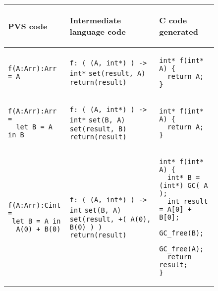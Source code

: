 \documentclass[12pt,a4paper]{article}
\newcommand{\cl}[1]{\texttt{#1}}
\begin{document}
\begin{figure}[!ht]
\begin{tabular}{|p{5.2cm}|p{5.8cm}|p{6cm}|}
\hline
\begin{center}
PVS code
\end{center} &
\begin{center}
Intermediate language code
\end{center} &
\begin{center}
C code generated
\end{center} \\ \hline

\begin{lstlisting}
f(A:Arr):Arr = A
\end{lstlisting} &
\cl{f: ( (A, int*) ) -> int*} \newline
\cl{set(result, A)} \newline
\cl{return(result)} &
\begin{lstlisting}
int* f(int* A) {
  return A;
}
\end{lstlisting} \\ \hline

\begin{lstlisting}
f(A:Arr):Arr =
  let B = A in B
\end{lstlisting} &
\cl{f: ( (A, int*) ) -> int*} \newline
\cl{set(B, A)} \newline
\cl{set(result, B)} \newline
\cl{return(result)} &
\begin{lstlisting}
int* f(int* A) {
  return A;
}
\end{lstlisting} \\ \hline

\begin{lstlisting}
f(A:Arr):Cint =
 let B = A in
  A(0) + B(0)
\end{lstlisting} &
\cl{f: ( (A, int*) ) -> int} \newline
\cl{set(B, A)} \newline
\cl{set(result, +( A(0), B(0) ) )} \newline
\cl{return(result)} &
\begin{lstlisting}
int* f(int* A) {
  int* B = (int*) GC( A );
  int result = A[0] + B[0];
  GC_free(B);
  GC_free(A);
  return result;
}
\end{lstlisting} \\ \hline


\end{tabular}
\end{figure}
\end{document}
